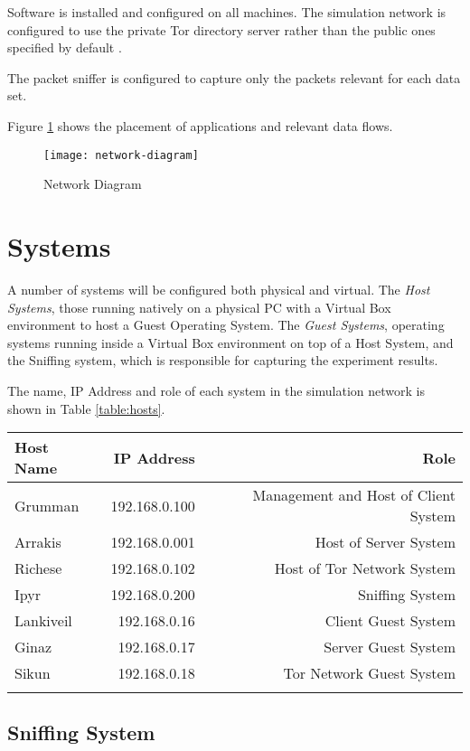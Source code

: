 Software is installed and configured on all machines. The simulation network is
configured to use the private Tor directory server rather than the public ones
specified by default \parencite{website:private-tor-network}.

The packet sniffer is configured to capture only the packets relevant for each
data set.

Figure \ref{network-diagram} shows the placement of applications and relevant
data flows.

\begin{figure}[H]
  \centering\texttt{[image: network-diagram]}
  \caption{Network Diagram}
  \label{network-diagram}
\end{figure}

\section{Systems}

A number of systems will be configured both physical and virtual. The \emph{Host Systems}, those running natively on a physical PC with a Virtual Box environment to host a Guest Operating System. The \emph{Guest Systems}, operating systems running inside a Virtual Box environment on top of a Host System, and the Sniffing system, which is responsible for capturing the experiment results.

The name, IP Address and role of each system in the simulation network is shown in Table \ref{table:hosts}.

\begin{tabular}{lrr}
  \toprule
  Host Name & IP Address & Role\\
  \midrule
  Grumman & 192.168.0.100 & Management and Host of Client System \\
  Arrakis & 192.168.0.001 & Host of Server System \\
  Richese & 192.168.0.102 & Host of Tor Network System \\
  \midrule
  Ipyr & 192.168.0.200 & Sniffing System \\
  \midrule
  Lankiveil & 192.168.0.16 & Client Guest System \\
  Ginaz & 192.168.0.17 & Server Guest System \\
  Sikun & 192.168.0.18 & Tor Network Guest System \\
  \botomrule
  \label{table:hosts}
\end{tabular}

\subsection{Sniffing System}

